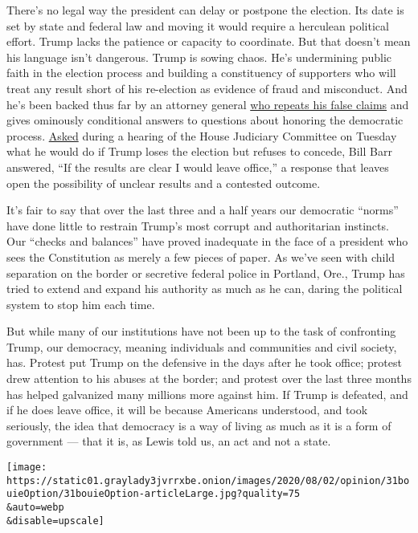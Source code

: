 There's no legal way the president can delay or postpone the election.
Its date is set by state and federal law and moving it would require a
herculean political effort. Trump lacks the patience or capacity to
coordinate. But that doesn't mean his language isn't dangerous. Trump is
sowing chaos. He's undermining public faith in the election process and
building a constituency of supporters who will treat any result short of
his re-election as evidence of fraud and misconduct. And he's been
backed thus far by an attorney general
\href{https://www.cnn.com/2020/06/25/politics/barr-mail-in-voting-election-fraud-npr/index.html}{who
repeats his false claims} and gives ominously conditional answers to
questions about honoring the democratic process.
\href{https://abcnews.go.com/Politics/barr-testimony-live-updates-ag-faces-questions-2020/story?id=72029139}{Asked}
during a hearing of the House Judiciary Committee on Tuesday what he
would do if Trump loses the election but refuses to concede, Bill Barr
answered, ``If the results are clear I would leave office,'' a response
that leaves open the possibility of unclear results and a contested
outcome.

It's fair to say that over the last three and a half years our
democratic ``norms'' have done little to restrain Trump's most corrupt
and authoritarian instincts. Our ``checks and balances'' have proved
inadequate in the face of a president who sees the Constitution as
merely a few pieces of paper. As we've seen with child separation on the
border or secretive federal police in Portland, Ore., Trump has tried to
extend and expand his authority as much as he can, daring the political
system to stop him each time.

But while many of our institutions have not been up to the task of
confronting Trump, our democracy, meaning individuals and communities
and civil society, has. Protest put Trump on the defensive in the days
after he took office; protest drew attention to his abuses at the
border; and protest over the last three months has helped galvanized
many millions more against him. If Trump is defeated, and if he does
leave office, it will be because Americans understood, and took
seriously, the idea that democracy is a way of living as much as it is a
form of government --- that it is, as Lewis told us, an act and not a
state.

\texttt{[image: https://static01.graylady3jvrrxbe.onion/images/2020/08/02/opinion/31bouieOption/31bouieOption-articleLarge.jpg?quality=75\\\&auto=webp\\\&disable=upscale]}

